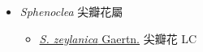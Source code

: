 
  \begin{itemize}
 \item[] \textit{Sphenoclea} 尖瓣花屬
                                
  \begin{itemize}
        \item[] \href{http://www.theplantlist.org/tpl1.1/search?q=Sphenoclea+zeylanica}{\textit{S. zeylanica} Gaertn.}   尖瓣花   LC
  \end{itemize}
  \end{itemize}
